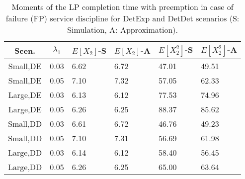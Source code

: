 \documentclass[11pt,journal,oneside,onecolumn,draftclsnofoot]{IEEEtran}
\begin{document}
\begin{table}[]
\renewcommand{\arraystretch}{1.3}
 \scriptsize
\caption{{Moments of the LP completion time with preemption in case of failure (FP) service discipline for DetExp and DetDet scenarios (S: Simulation, A: Approximation). }}\label{tab:X2moments-NewPr}
\begin{tabular} {|c|c|l|l|l|l|}
 \hline
 {\textbf{Scen.}}&{\textbf {$\lambda_1$}}&{\textbf {$E[X_2]$-S}} &{\textbf {$E[X_2]$-A}}&{\textbf {$E[X^2_2]$-S}}&{\textbf {$E[X^2_2]$-A}} \\
 \hline
Small,DE&0.03&6.62&6.72&47.01&49.51\\
 \hline
Small,DE&0.05&7.10&7.32&57.05&62.33\\
 \hline
Large,DE&0.03&6.13&6.12&77.53&74.96\\
 \hline
Large,DE&0.05&6.26&6.25&88.37&85.62\\
\hline
\hline
Small,DD&0.03&6.61&6.72&46.76&49.23\\
 \hline
Small,DD&0.05&7.10&7.31&56.69&61.98\\
 \hline
Large,DD&0.03&6.14&6.12&58.40&56.45\\
 \hline
Large,DD&0.05&6.26&6.25&65.00&63.64\\
\hline
\end{tabular}
\normalsize
\end{table}
\normalsize
\end{document}
